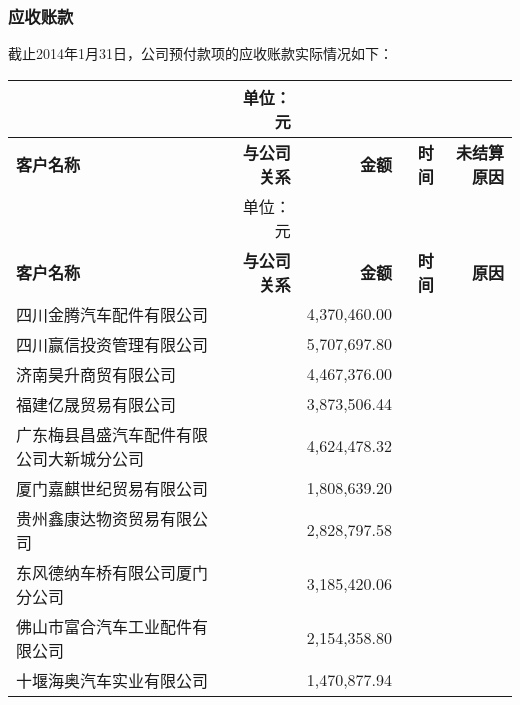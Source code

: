 \subsubsection{应收账款}
截止2014年1月31日，公司预付款项的应收账款实际情况如下：
\renewcommand*{\arraystretch}{0.6}
\setlength{\tabcolsep}{4pt}
\begin{longtable}{>{\scriptsize}l>{\scriptsize}r>{\scriptsize}r>{\scriptsize}r>{\scriptsize}r}
 \multicolumn{4}{c}{\footnotesize \bfseries 应收账款} & {\scriptsize 单位：元}\\
\hline\hline
\rowcolor{mycyan} {\bfseries \footnotesize  客户名称} & {\bfseries \footnotesize  与公司关系}\hspace{2ex} & {\bfseries \footnotesize   金额}\hspace{2ex} &  {\bfseries \footnotesize  时间}\hspace{4ex}      & {\bfseries \footnotesize  未结算原因} \\  \endfirsthead          %
 \multicolumn{4}{c}{\footnotesize \bfseries 应收账款（续表）} & {\scriptsize 单位：元}\\                     %
\hline\hline
\rowcolor{mycyan} {\bfseries \footnotesize  客户名称} & {\bfseries \footnotesize  与公司关系}\hspace{2ex} & {\bfseries \footnotesize   金额}\hspace{2ex} &  {\bfseries \footnotesize  时间}\hspace{4ex}      & {\bfseries \footnotesize  原因} \\  \endhead                %
\hline
\endfoot
\hline   %
四川金腾汽车配件有限公司 &  & 
4,370,460.00  &  & \\
四川赢信投资管理有限公司 &  &
5,707,697.80 &  & \\
济南昊升商贸有限公司 &  &
4,467,376.00 &  & \\
福建亿晟贸易有限公司 &  &
3,873,506.44 &  & \\
广东梅县昌盛汽车配件有限公司大新城分公司 &  &
4,624,478.32 &  & \\
厦门嘉麒世纪贸易有限公司 &  &
1,808,639.20 &  & \\
贵州鑫康达物资贸易有限公司 &  &
2,828,797.58 &  & \\
东风德纳车桥有限公司厦门分公司 &  &
3,185,420.06 &  & \\
佛山市富合汽车工业配件有限公司 &  &
2,154,358.80 &  & \\
十堰海奥汽车实业有限公司 &  &
1,470,877.94 &  & \\

\end{longtable}

